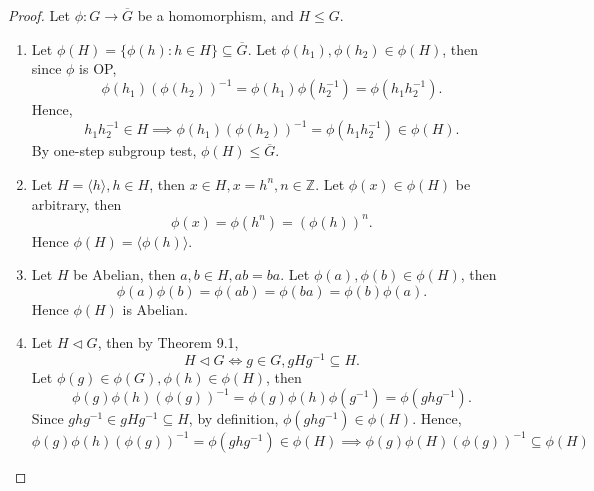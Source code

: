 \documentclass{article}
\theoremstyle{definition}
\begin{document}
    \begin{proof}
       Let $\phi:G \to \overline{G}$ be a homomorphism, and $H \leq G$.
       \begin{enumerate}
           \item Let $\phi(H) = \{\phi(h):h\in H\} \subseteq \overline{G}$. Let $\phi(h_1),\phi(h_2) \in \phi(H)$, then since $\phi$ is OP,
           \begin{equation*}
               \phi(h_1)(\phi(h_2))^{-1} = \phi(h_1)\phi(h_2^{-1}) = \phi(h_1h_2^{-1}).
           \end{equation*}
           Hence,
           \begin{equation*}
               h_1h_2^{-1} \in H \implies \phi(h_1)(\phi(h_2))^{-1} = \phi(h_1h_2^{-1}) \in \phi(H).
           \end{equation*}
           By one-step subgroup test, $\phi(H) \leq \overline{G}$.
           \item Let $H = \langle h \rangle, h \in H$, then $x \in H, x=h^n, n \in \mathbb{Z}$. Let $\phi(x) \in \phi(H)$ be arbitrary, then
           \begin{equation*}
               \phi(x) = \phi(h^n) = (\phi(h))^n.
           \end{equation*}
           Hence $\phi(H) = \langle \phi(h) \rangle$.
           \item Let $H$ be Abelian, then $a,b \in H, ab=ba$. Let $\phi(a),\phi(b) \in \phi(H)$, then
           \begin{equation*}
               \phi(a)\phi(b) = \phi(ab) = \phi(ba) = \phi(b)\phi(a).
           \end{equation*}
           Hence $\phi(H)$ is Abelian.
           \item Let $H \lhd G$, then by Theorem 9.1,
           \begin{equation*}
               H \lhd G \iff g \in G, gHg^{-1} \subseteq H.
           \end{equation*}
           Let $\phi(g) \in \phi(G), \phi(h) \in \phi(H)$, then
           \begin{equation*}
               \phi(g)\phi(h)(\phi(g))^{-1} = \phi(g)\phi(h)\phi(g^{-1}) = \phi(ghg^{-1}).
           \end{equation*}
           Since $ghg^{-1} \in gHg^{-1} \subseteq H$, by definition, $\phi(ghg^{-1}) \in \phi(H)$. Hence,
           \begin{equation*}
               \phi(g)\phi(h)(\phi(g))^{-1} = \phi(ghg^{-1}) \in \phi(H) \implies \phi(g)\phi(H)(\phi(g))^{-1} \subseteq \phi(H)

\end{equation*}
\end{enumerate}
\end{proof}
\end{document}
